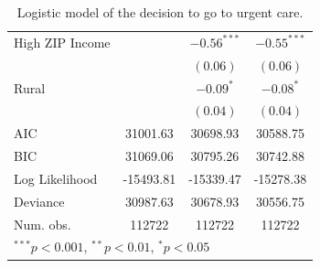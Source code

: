 \documentclass[12pt,twoside]{reedthesis}
\begin{document}
\begin{table}
\begin{center}
\begin{small}
\begin{tabular}{l c c c }
  High ZIP Income               &                        & $\mathbf{-0.56}^{***}$ & $\mathbf{-0.55}^{***}$ \\
                                &                        & $(0.06)$               & $(0.06)$               \\
  Rural                         &                        & $-0.09^{*}$            & $-0.08^{*}$            \\
                                &                        & $(0.04)$               & $(0.04)$               \\
  \hline
  AIC                           & 31001.63               & 30698.93               & 30588.75               \\
  BIC                           & 31069.06               & 30795.26               & 30742.88               \\
  Log Likelihood                & -15493.81              & -15339.47              & -15278.38              \\
  Deviance                      & 30987.63               & 30678.93               & 30556.75               \\
  Num. obs.                     & 112722                 & 112722                 & 112722                 \\
  \hline
  \multicolumn{4}{l}{\tiny{$^{***}p<0.001$, $^{**}p<0.01$, $^*p<0.05$}}
  \end{tabular}
  \end{small}
  \caption{Logistic model of the decision to go to urgent care.}
  \label{table:coefficients}
  \end{center}
  \end{table}
  
\end{document}

